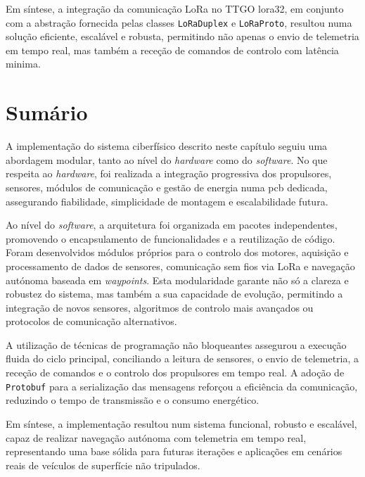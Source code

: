 Em síntese, a integração da comunicação LoRa no TTGO \gls{lora}32, em conjunto com a abstração fornecida pelas classes \texttt{LoRaDuplex} e \texttt{LoRaProto}, resultou numa solução eficiente, escalável e robusta, permitindo não apenas o envio de telemetria em tempo real, mas também a receção de comandos de controlo com latência minima.

\section{Sumário}
\label{sec:implementacao-sumario}

A implementação do sistema ciberfísico descrito neste capítulo seguiu uma abordagem modular, tanto ao nível do \emph{hardware} como do \emph{software}. No que respeita ao \emph{hardware}, foi realizada a integração progressiva dos propulsores, sensores, módulos de comunicação e gestão de energia numa \gls{pcb} dedicada, assegurando fiabilidade, simplicidade de montagem e escalabilidade futura.  

Ao nível do \emph{software}, a arquitetura foi organizada em pacotes independentes, promovendo o encapsulamento de funcionalidades e a reutilização de código. Foram desenvolvidos módulos próprios para o controlo dos motores, aquisição e processamento de dados de sensores, comunicação sem fios via LoRa e navegação autónoma baseada em \emph{waypoints}. Esta modularidade garante não só a clareza e robustez do sistema, mas também a sua capacidade de evolução, permitindo a integração de novos sensores, algoritmos de controlo mais avançados ou protocolos de comunicação alternativos.  

A utilização de técnicas de programação não bloqueantes assegurou a execução fluida do ciclo principal, conciliando a leitura de sensores, o envio de telemetria, a receção de comandos e o controlo dos propulsores em tempo real. A adoção de \texttt{Protobuf} para a serialização das mensagens reforçou a eficiência da comunicação, reduzindo o tempo de transmissão e o consumo energético.  

Em síntese, a implementação resultou num sistema funcional, robusto e escalável, capaz de realizar navegação autónoma com telemetria em tempo real, representando uma base sólida para futuras iterações e aplicações em cenários reais de veículos de superfície não tripulados.

